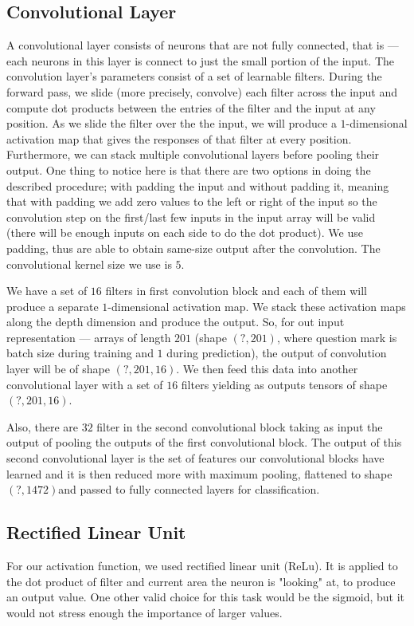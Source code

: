 \documentclass[twoside]{article}
\begin{document}
\begin{multicols}{2}
\subsection{Convolutional Layer}
A convolutional layer consists of neurons that are not fully connected, that is --- each neurons in this layer is connect to just the small portion of the input. The convolution layer’s parameters consist of a set of learnable filters. During the forward pass, we slide (more precisely, convolve) each filter across the input and compute dot products between the entries of the filter and the input at any position. As we slide the filter over the the input, we will produce a $1$-dimensional activation map that gives the responses of that filter at every position. Furthermore, we can stack multiple convolutional layers before pooling their output. One thing to notice here is that there are two options in doing the described procedure; with padding the input and without padding it, meaning that with padding we add zero values to the left or right of the input so the convolution step on the first/last few inputs in the input array will be valid (there will be enough inputs on each side to do the dot product). We use padding, thus are able to obtain same-size output after the convolution. The convolutional kernel size we use is $5$.

We have a set of $16$ filters in first convolution block and each of them will produce a separate $1$-dimensional activation map. We stack these activation maps along the depth dimension and produce the output. So, for out input representation --- arrays of length $201$ (shape $(?,201)$, where question mark is batch size during training and $1$ during prediction), the output of convolution layer will be of shape $(?,201,16)$. We then feed this data into another convolutional layer with a set of $16$ filters yielding as outputs tensors of shape $(?,201,16)$.

Also, there are $32$ filter in the second convolutional block taking as input the output of pooling the outputs of the first convolutional block. The output of this second convolutional layer is the set of features our convolutional blocks have learned and it is then reduced more with maximum pooling, flattened to shape $(?,1472) $and passed to fully connected layers for classification.

\subsection{Rectified Linear Unit}
For our activation function, we used rectified linear unit (ReLu). It is applied to the dot product of filter and current area the neuron is "looking" at, to produce an output value. One other valid choice for this task would be the sigmoid, but it would not stress enough the importance of larger values.


\end{multicols}
\end{document}
